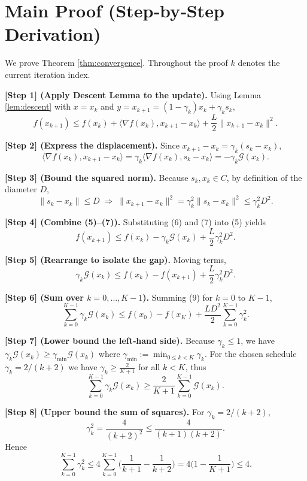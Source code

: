 \documentclass{article}
\newcommand{\grad}{\nabla}
\newcommand{\inner}[2]{\langle #1,#2\rangle}
\newcommand{\gap}{\mathcal{G}}
\begin{document}
\section*{Main Proof (Step‑by‑Step Derivation)}
We prove Theorem \ref{thm:convergence}. Throughout the proof $k$ denotes the current iteration index.

\noindent\textbf{[Step 1] (Apply Descent Lemma to the update).}  
Using Lemma \ref{lem:descent} with $x=x_k$ and $y=x_{k+1}=(1-\gamma_k)x_k+\gamma_k s_k$,
\[
f(x_{k+1})\le f(x_k)+\inner{\grad f(x_k)}{x_{k+1}-x_k}
                +\frac{L}{2}\|x_{k+1}-x_k\|^{2}. \tag{5}
\]

\noindent\textbf{[Step 2] (Express the displacement).}  
Since $x_{k+1}-x_k=\gamma_k(s_k-x_k)$,
\[
\inner{\grad f(x_k)}{x_{k+1}-x_k}= \gamma_k\inner{\grad f(x_k)}{s_k-x_k}
= -\gamma_k\gap(x_k). \tag{6}
\]

\noindent\textbf{[Step 3] (Bound the squared norm).}  
Because $s_k,x_k\in C$, by definition of the diameter $D$,
\[
\|s_k-x_k\|\le D\;\Longrightarrow\;
\|x_{k+1}-x_k\|^{2}= \gamma_k^{2}\|s_k-x_k\|^{2}\le \gamma_k^{2} D^{2}. \tag{7}
\]

\noindent\textbf{[Step 4] (Combine (5)–(7)).}  
Substituting (6) and (7) into (5) yields
\[
f(x_{k+1})\le f(x_k)-\gamma_k\gap(x_k)+\frac{L}{2}\gamma_k^{2}D^{2}. \tag{8}
\]

\noindent\textbf{[Step 5] (Rearrange to isolate the gap).}  
Moving terms,
\[
\gamma_k\gap(x_k)\le f(x_k)-f(x_{k+1})+\frac{L}{2}\gamma_k^{2}D^{2}. \tag{9}
\]

\noindent\textbf{[Step 6] (Sum over $k=0,\dots,K-1$).}  
Summing (9) for $k=0$ to $K-1$,
\[
\sum_{k=0}^{K-1}\gamma_k\gap(x_k)
\le f(x_0)-f(x_K)+\frac{L D^{2}}{2}\sum_{k=0}^{K-1}\gamma_k^{2}. \tag{10}
\]

\noindent\textbf{[Step 7] (Lower bound the left‑hand side).}  
Because $\gamma_k\le 1$, we have $\gamma_k\gap(x_k)\ge \gamma_{\min}\gap(x_k)$ where
$\gamma_{\min}:=\min_{0\le k<K}\gamma_k$. For the chosen schedule $\gamma_k=2/(k+2)$ we have
$\gamma_k\ge \frac{2}{K+1}$ for all $k< K$, thus
\[
\sum_{k=0}^{K-1}\gamma_k\gap(x_k) \ge \frac{2}{K+1}\sum_{k=0}^{K-1}\gap(x_k). \tag{11}
\]

\noindent\textbf{[Step 8] (Upper bound the sum of squares).}  
For $\gamma_k=2/(k+2)$,
\[
\gamma_k^{2}= \frac{4}{(k+2)^{2}}\le \frac{4}{(k+1)(k+2)}.
\]
Hence
\[
\sum_{k=0}^{K-1}\gamma_k^{2}
\le 4\sum_{k=0}^{K-1}\Big(\frac{1}{k+1}-\frac{1}{k+2}\Big)
=4\Big(1-\frac{1}{K+1}\Big)\le 4 . \tag{12}
\]
\end{document}
